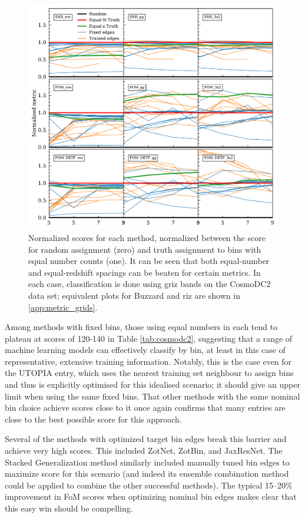 \documentclass[twocolumn,twocolappendix]{aastex63}
\begin{document}
\begin{figure}
\includegraphics[width=1\linewidth]{results/metric_grid_dc2_griz.pdf}
\caption{Normalized scores for each method, normalized between the score for random assignment (zero) and truth assignment to bins with equal number counts (one).  It can be seen that both equal-number and equal-redshift spacings can be beaten for certain metrics.  In each case, classification is done using griz bands on the CosmoDC2 data set; equivalent plots for Buzzard and riz are shown in \autoref{app:metric_grids}.}
\label{fig:metric_grid_dc2_griz}
\end{figure}


Among methods with fixed bins, those using equal numbers in each tend to plateau at scores of
120-140 in Table \ref{tab:cosmodc2}, suggesting that a range of machine learning models can
effectively classify by bin, at least in this case of representative, extensive training
information.  Notably, this is the case even for the \textsc{UTOPIA} entry, which uses the nearest 
training set neighbour to assign bins and thus is explicitly optimised
for this idealised scenario; it should give an upper limit when using the same fixed bins.
That other methods with the same nominal bin choice achieve scores close to it once again
confirms that many entries are close to the best possible score for this approach.


Several of the methods with optimized target bin edges break this
barrier and achieve very high scores.  This included ZotNet, ZotBin,  and JaxResNet.  The
Stacked Generalization method similarly included manually tuned bin edges to maximize
score for this scenario (and indeed its ensemble combination method could be applied to
combine the other successful methods). The typical 15--20\% improvement in FoM scores when optimizing
nominal bin edges makes clear that this easy win should be compelling.
\end{document}
